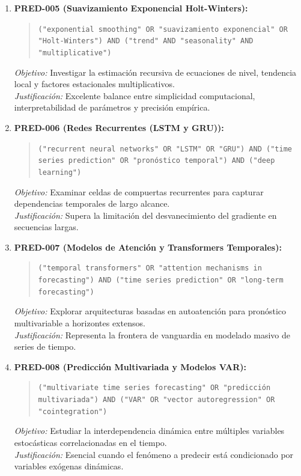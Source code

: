 \begin{enumerate}
  \textit{Justificación:} Establece el marco canónico para modelar dependencias lineales en el dominio del tiempo.
  \item \textbf{PRED-005 (Suavizamiento Exponencial Holt-Winters):}
  \begin{quote}
  \texttt{("exponential smoothing" OR "suavizamiento exponencial" OR "Holt-Winters") AND ("trend" AND "seasonality" AND "multiplicative")}
  \end{quote}
  \textit{Objetivo:} Investigar la estimación recursiva de ecuaciones de nivel, tendencia local y factores estacionales multiplicativos.\\
  \textit{Justificación:} Excelente balance entre simplicidad computacional, interpretabilidad de parámetros y precisión empírica.
  \item \textbf{PRED-006 (Redes Recurrentes (LSTM y GRU)):}
  \begin{quote}
  \texttt{("recurrent neural networks" OR "LSTM" OR "GRU") AND ("time series prediction" OR "pronóstico temporal") AND ("deep learning")}
  \end{quote}
  \textit{Objetivo:} Examinar celdas de compuertas recurrentes para capturar dependencias temporales de largo alcance.\\
  \textit{Justificación:} Supera la limitación del desvanecimiento del gradiente en secuencias largas.
  \item \textbf{PRED-007 (Modelos de Atención y Transformers Temporales):}
  \begin{quote}
  \texttt{("temporal transformers" OR "attention mechanisms in forecasting") AND ("time series prediction" OR "long-term forecasting")}
  \end{quote}
  \textit{Objetivo:} Explorar arquitecturas basadas en autoatención para pronóstico multivariable a horizontes extensos.\\
  \textit{Justificación:} Representa la frontera de vanguardia en modelado masivo de series de tiempo.
  \item \textbf{PRED-008 (Predicción Multivariada y Modelos VAR):}
  \begin{quote}
  \texttt{("multivariate time series forecasting" OR "predicción multivariada") AND ("VAR" OR "vector autoregression" OR "cointegration")}
  \end{quote}
  \textit{Objetivo:} Estudiar la interdependencia dinámica entre múltiples variables estocásticas correlacionadas en el tiempo.\\
  \textit{Justificación:} Esencial cuando el fenómeno a predecir está condicionado por variables exógenas dinámicas.

\end{enumerate}
